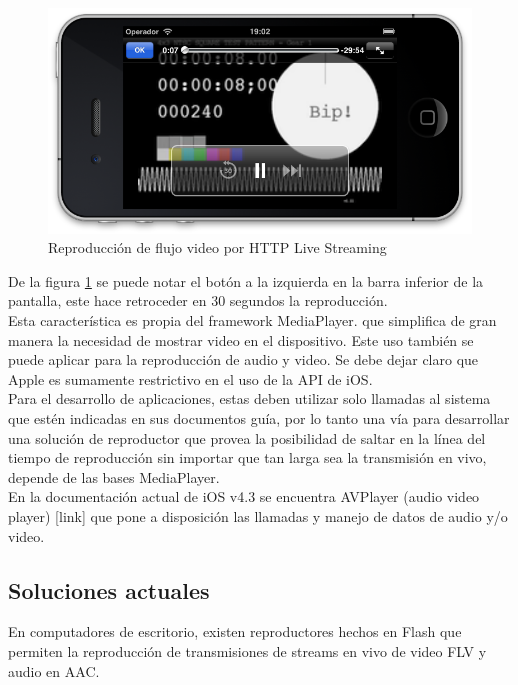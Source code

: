 \begin{figure}[h!]
	\centering
	\includegraphics[scale=0.55]{imgs/sshot_iOS_hls.png}
	\caption{Reproducción de flujo video por HTTP Live Streaming}
	\label{sshot_iOS_hls}	
\end{figure}

De la figura \ref{sshot_iOS_hls} se puede notar el botón a la izquierda en la barra inferior de  la pantalla, este hace retroceder en 30 segundos la reproducción.\\

Esta característica es propia del framework MediaPlayer. que simplifica de gran manera la necesidad de mostrar video en el dispositivo. Este uso también se puede aplicar para la reproducción  de  audio y video.
Se debe dejar claro que Apple es sumamente restrictivo en el uso de la API de iOS. \\
Para el desarrollo de aplicaciones, estas deben utilizar solo llamadas al sistema que estén indicadas en sus documentos guía, por lo tanto una vía para desarrollar una solución de reproductor que provea la posibilidad de saltar en la línea del tiempo de reproducción sin importar que tan larga sea la transmisión en vivo, depende de las bases MediaPlayer. \\

En la documentación actual de iOS v4.3 se encuentra AVPlayer (audio video player) [link] que pone a disposición las llamadas y manejo de datos de audio y/o video.


\subsection{Soluciones actuales}
En computadores de escritorio, existen reproductores hechos en Flash que permiten la reproducción de transmisiones de streams en vivo de video FLV y audio en AAC.\\

